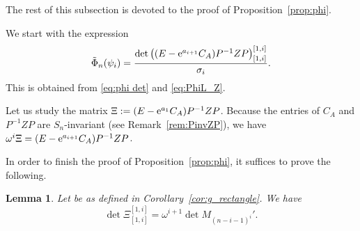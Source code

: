 \documentclass[10pt,a4paper]{amsart}
\numberwithin{equation}{section}
\newcommand{\fac}{\psi}
\newtheorem{Lemma}[Theorem]{Lemma}
\theoremstyle{definition}
\begin{document}
The rest of this subsection is devoted to the proof of Proposition~\ref{prop:phi}.


We start with the expression
\[
\tilde{\Phi}_n(\fac_i)=
\frac{\det\left((E-{\rm e}^{a_{i+1}}C_A )P^{-1}ZP\right)_{[1,i]}^{[1,i]}}{\sigma_i}.
\]
This is obtained from
\eqref{eq:phi det} and
\eqref{eq:PhiL_Z}.



Let us study the matrix
$
\Xi:=
(E-{\rm e}^{a_1}C_A)P^{-1}ZP$.
Because the entries of $C_A$ and $P^{-1}ZP$ are $S_n$-invariant (see Remark~\ref{rem:PinvZP}),
we have
$
 \omega^i \Xi=
(E-{\rm e}^{a_{i+1}}C_A)P^{-1}ZP$.

In order to finish the proof of Proposition~\ref{prop:phi}, it suffices to prove the following.
\begin{Lemma}\label{lem:det Xi}
Let  be as defined in Corollary~{\rm\ref{cor:g_rectangle}}.
We have
\begin{equation}
\det \Xi_{[1,i]}^{[1,i]}=\omega^{i+1} \det M_{(n-i-1)^i}'.
\label{eq:det Xi}
\end{equation}
\end{Lemma}
\end{document}
